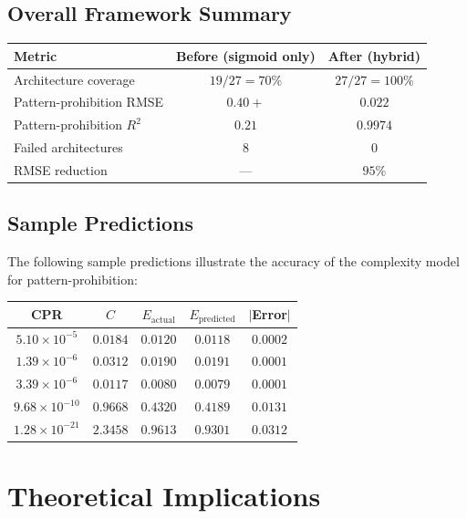 \documentclass[12pt,a4paper]{article}
\begin{document}
\subsection{Overall Framework Summary}

\begin{center}
\begin{tabular}{lcc}
\toprule
Metric & Before (sigmoid only) & After (hybrid) \\
\midrule
Architecture coverage   & $19/27 = 70\%$  & $27/27 = 100\%$ \\
Pattern-prohibition RMSE & $0.40+$         & $0.022$ \\
Pattern-prohibition $R^{2}$ & $0.21$       & $0.9974$ \\
Failed architectures    & $8$             & $0$ \\
RMSE reduction          & ---             & $95\%$ \\
\bottomrule
\end{tabular}
\end{center}

\subsection{Sample Predictions}

The following sample predictions illustrate the accuracy of the complexity model for pattern-prohibition:

\begin{center}
\begin{tabular}{ccccc}
\toprule
CPR & $C$ & $E_{\text{actual}}$ & $E_{\text{predicted}}$ & $|$Error$|$ \\
\midrule
$5.10\times10^{-5}$ & $0.0184$ & $0.0120$ & $0.0118$ & $0.0002$ \\
$1.39\times10^{-6}$ & $0.0312$ & $0.0190$ & $0.0191$ & $0.0001$ \\
$3.39\times10^{-6}$ & $0.0117$ & $0.0080$ & $0.0079$ & $0.0001$ \\
$9.68\times10^{-10}$& $0.9668$ & $0.4320$ & $0.4189$ & $0.0131$ \\
$1.28\times10^{-21}$& $2.3458$ & $0.9613$ & $0.9301$ & $0.0312$ \\
\bottomrule
\end{tabular}
\end{center}

\section{Theoretical Implications}\label{sec:theory}
\end{document}
